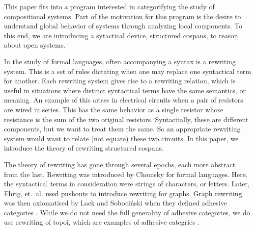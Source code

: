 \documentclass{amsart}
\theoremstyle{remark}
\theoremstyle{definition}
\begin{document}
This paper fits into a program interested in categorifying the study
of compositional systems.  Part of the motivation for this program is
the desire to understand global behavior of systems through analyzing
local components.  To this end, we are introducing a sytactical
device, structured cospans, to reason about open systems.

In the study of formal languages, often accompanying a syntax is a
rewriting system.  This is a set of rules dictating when one may
replace one syntactical term for another.  Each rewriting system gives
rise to a rewriting relation, which is useful in situations where
distinct syntactical terms have the same semantics, or meaning.  An
example of this arises in electrical circuits when a pair of
resistors are wired in series. This has the same behavior as a single
resistor whose resistance is the sum of the two original resistors.
Syntacitally, these are different components, but we want to treat
them the same.  So an appropriate rewriting system would want to
relate (not equate) these two circuits.   In this paper, we introduce
the theory of rewriting structured cospans.

The theory of rewriting has gone through several epochs, each more
abstract from the last.  Rewriting was introduced by Chomsky for
formal languages. Here, the syntactical terms in consideration were
strings of characters, or letters.  Later, Ehrig,
et.~al. \cite{graphtrans} used pushouts to introduce rewriting for
graphs.  Graph rewriting was then axiomatised by Lack and
Soboci\'{n}ski when they defined adhesive categories
\cite{LackSobo_Adhesive}.  While we do not need the full generality of
adhesive categories, we do use rewriting of topoi, which are examples
of adhesive categries \cite{LackSobo_ToposIsAdh}.
\end{document}
